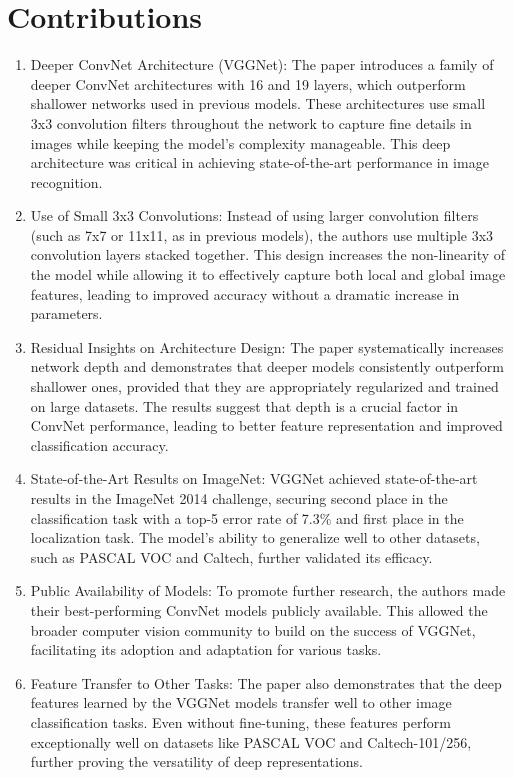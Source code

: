 \documentclass{report}
\begin{document}
	\section{Contributions}
	\begin{enumerate}
		\item 
		Deeper ConvNet Architecture (VGGNet): The paper introduces a family of deeper ConvNet architectures with 16 and 19 layers, which outperform shallower networks used in previous models. These architectures use small 3x3 convolution filters throughout the network to capture fine details in images while keeping the model's complexity manageable. This deep architecture was critical in achieving state-of-the-art performance in image recognition.
		
		\item 
		Use of Small 3x3 Convolutions: Instead of using larger convolution filters (such as 7x7 or 11x11, as in previous models), the authors use multiple 3x3 convolution layers stacked together. This design increases the non-linearity of the model while allowing it to effectively capture both local and global image features, leading to improved accuracy without a dramatic increase in parameters.
		
		\item 
		Residual Insights on Architecture Design: The paper systematically increases network depth and demonstrates that deeper models consistently outperform shallower ones, provided that they are appropriately regularized and trained on large datasets. The results suggest that depth is a crucial factor in ConvNet performance, leading to better feature representation and improved classification accuracy.
		
		\item 
		State-of-the-Art Results on ImageNet: VGGNet achieved state-of-the-art results in the ImageNet 2014 challenge, securing second place in the classification task with a top-5 error rate of 7.3\% and first place in the localization task. The model's ability to generalize well to other datasets, such as PASCAL VOC and Caltech, further validated its efficacy.
		
		\item 
		Public Availability of Models: To promote further research, the authors made their best-performing ConvNet models publicly available. This allowed the broader computer vision community to build on the success of VGGNet, facilitating its adoption and adaptation for various tasks.
		
		\item 
		Feature Transfer to Other Tasks: The paper also demonstrates that the deep features learned by the VGGNet models transfer well to other image classification tasks. Even without fine-tuning, these features perform exceptionally well on datasets like PASCAL VOC and Caltech-101/256, further proving the versatility of deep representations.
	\end{enumerate}
	
\end{document}
